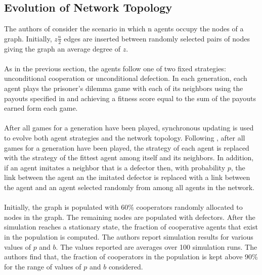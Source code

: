 \documentclass{article}
\begin{document}
	\subsection{Evolution of Network Topology} \label{evo-net-topology}
	The authors of \cite{Eguiluz2005} consider the scenario in which n agents occupy the nodes of a graph.  Initially, $z\frac{n}{2}$ edges are inserted between randomly selected pairs of nodes giving the graph an average degree of $z$.
	\paragraph{}As in the previous section, the agents follow one of two fixed strategies: unconditional cooperation or unconditional defection.  In each generation, each agent plays the prisoner's dilemma game with each of its neighbors using the payouts specified in \cite{Nowak1992} and achieving a fitness score equal to the sum of the payouts earned form each game.
	\paragraph{}After all games for a generation have been played, synchronous updating is used to evolve both agent strategies and the network topology.  Following \cite{Nowak1992}, after all games for a generation have been played, the strategy of each agent is replaced with the strategy of the fittest agent among itself and its neighbors.  In addition, if an agent imitates a neighbor that is a defector then, with probability $p$, the link between the agent an the imitated defector is replaced with a link between the agent and an agent selected randomly from among all agents in the network.
	\paragraph{}Initially, the graph is populated with 60\% cooperators randomly allocated to nodes in the graph.  The remaining nodes are populated with defectors.  After the simulation reaches a stationary state, the fraction of cooperative agents that exist in the population is computed.  The authors report simulation results for various values of $p$ and $b$.  The values reported are averages over 100 simulation runs.  The authors find that, the fraction of cooperators in the population is kept above 90\% for the range of values of $p$ and $b$ considered.
\end{document}
